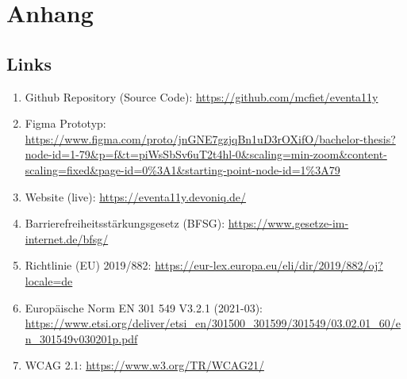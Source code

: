 \appendix
\chapter{Anhang}
\section{Links}

\begin{enumerate}
    \item Github Repository (Source Code): \url{https://github.com/mcfiet/eventa11y}

    \item Figma Prototyp: \url{https://www.figma.com/proto/jnGNE7gzjqBn1uD3rOXifO/bachelor-thesis?node-id=1-79&p=f&t=piWsSbSv6uT2t4hl-0&scaling=min-zoom&content-scaling=fixed&page-id=0%3A1&starting-point-node-id=1%3A79}

    \item Website (live): \url{https://eventa11y.devoniq.de/}

    \item Barrierefreiheitsstärkungsgesetz (BFSG): \url{https://www.gesetze-im-internet.de/bfsg/}

    \item Richtlinie (EU) 2019/882: \url{https://eur-lex.europa.eu/eli/dir/2019/882/oj?locale=de}

    \item Europäische Norm EN 301 549 V3.2.1 (2021-03): \url{https://www.etsi.org/deliver/etsi_en/301500_301599/301549/03.02.01_60/en_301549v030201p.pdf}

    \item WCAG 2.1: \url{https://www.w3.org/TR/WCAG21/}
\end{enumerate}



